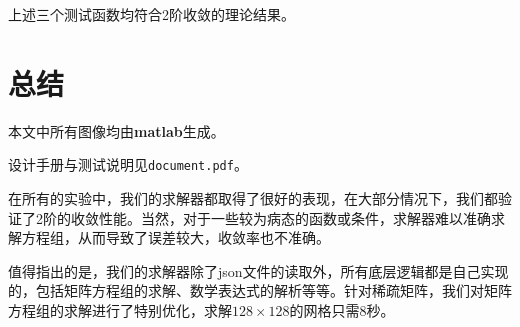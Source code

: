 \documentclass[lang=cn,11pt,a4paper]{elegantpaper}
\begin{document}
上述三个测试函数均符合2阶收敛的理论结果。

\section{总结}

本文中所有图像均由\textbf{matlab}生成。

设计手册与测试说明见\verb|document.pdf|。

在所有的实验中，我们的求解器都取得了很好的表现，在大部分情况下，我们都验证了2阶的收敛性能。当然，对于一些较为病态的函数或条件，求解器难以准确求解方程组，从而导致了误差较大，收敛率也不准确。

值得指出的是，我们的求解器除了json文件的读取外，所有底层逻辑都是自己实现的，包括矩阵方程组的求解、数学表达式的解析等等。针对稀疏矩阵，我们对矩阵方程组的求解进行了特别优化，求解$128\times 128$的网格只需8秒。
\end{document}
